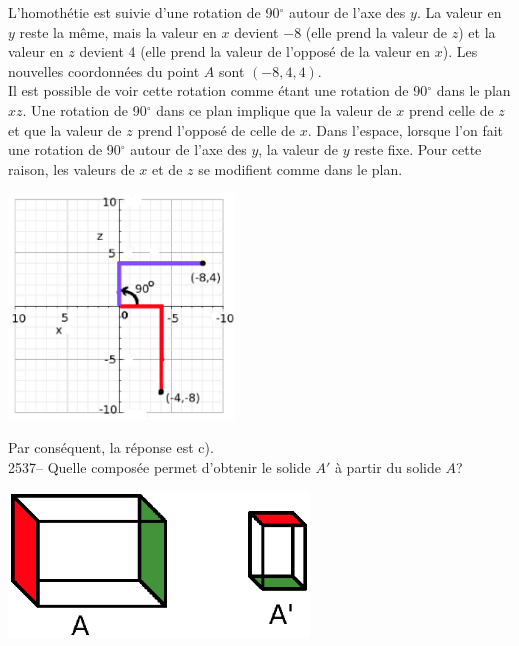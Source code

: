 \documentclass[letterpaper, 12pt]{article}
\begin{document}
L'homoth\'etie est suivie d'une rotation de 90$^{\circ}$ autour de l'axe des $y$. La valeur en $y$ reste la m\^eme, mais la valeur en $x$ devient $-8$ (elle prend la valeur de $z$) et la valeur en $z$ devient 4 (elle prend la valeur de l'oppos\'e de la valeur en $x$). Les nouvelles coordonn\'ees du point $A$ sont $(-8, 4, 4)$. \\

Il est possible de voir cette rotation comme \'etant une rotation de 90$^{\circ}$ dans le plan $xz$. Une rotation de 90$^{\circ}$ dans ce plan implique que la valeur de $x$ prend celle de $z$ et que la valeur de $z$ prend l'oppos\'e de celle de $x$. Dans l'espace, lorsque l'on fait une rotation de 90$^{\circ}$ autour de l'axe des $y$, la valeur de $y$ reste fixe. Pour cette raison, les valeurs de $x$ et de $z$ se modifient comme dans le plan.\\
\begin{center}
 \includegraphics[width=6cm,bb=14 14 415 415]{Q2536exp.eps}
\end{center}
Par cons\'equent, la r\'eponse est c).\\

2537-- Quelle compos\'ee permet d'obtenir le solide $A'$ \`a partir du solide $A$?\\
\begin{center}
 \includegraphics[width=8cm,bb=14 14 359 180]{Q2537.eps}
\end{center}
\end{document}
